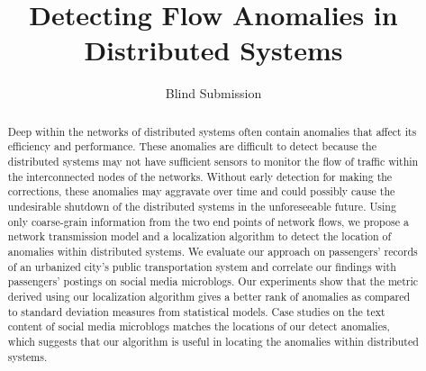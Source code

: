 \documentclass[conference]{IEEEtran.1.8}
\begin{document}
\title{Detecting Flow Anomalies in Distributed Systems}

\author{
	Blind Submission
}

\maketitle

\begin{abstract}
Deep within the networks of distributed systems often contain anomalies that affect its efficiency and performance. These anomalies are difficult to detect because the distributed systems may not have sufficient sensors to monitor the flow of traffic within the interconnected nodes of the networks. Without early detection for making the corrections, these anomalies may aggravate over time and could possibly cause the undesirable shutdown of the distributed systems in the unforeseeable future. Using only coarse-grain information from the two end points of network flows, we propose a network transmission model and a localization algorithm to detect the location of anomalies within distributed systems. We evaluate our approach on passengers' records of an urbanized city's public transportation system and correlate our findings with passengers' postings on social media microblogs. Our experiments show that the metric derived using our localization algorithm gives a better rank of anomalies as compared to standard deviation measures from statistical models. Case studies on the text content of social media microblogs matches the locations of our detect anomalies, which suggests that our algorithm is useful in locating the anomalies within distributed systems.
\end{abstract}
\end{document}
